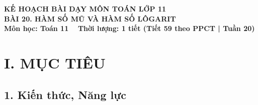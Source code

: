 \documentclass[12pt, a4paper]{article}
\begin{document}
\begin{center}
    {\fontsize{14pt}{17pt}\selectfont \textbf{KẾ HOẠCH BÀI DẠY MÔN TOÁN LỚP 11}}\\[6pt]
    {\fontsize{16pt}{19pt}\selectfont \textbf{BÀI 20. HÀM SỐ MŨ VÀ HÀM SỐ LÔGARIT}}\\[4pt]
    {\fontsize{12pt}{15pt}\selectfont \textbf{Môn học: Toán 11} \ \textbar \ \textbf{Thời lượng: 1 tiết (Tiết 59 theo PPCT | Tuần 20)}}
\end{center}

\vspace{5pt}

\section*{I. MỤC TIÊU}

\subsection*{1. Kiến thức, Năng lực}
\end{document}
